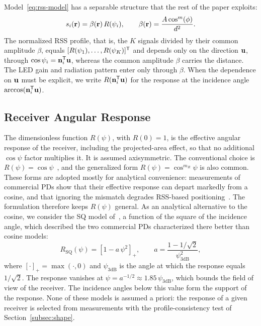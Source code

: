 Model~\eqref{eq:rss-model} has a separable structure that the rest of the paper exploits:
\begin{equation}
 s_i(\mathbf{r})=\beta(\mathbf{r})\,R(\psi_i),\qquad
 \beta(\mathbf{r})=\frac{A\cos^{m}(\phi)}{d^2}.
 \label{eq:separable}
\end{equation}
The normalized RSS profile, that is, the $K$ signals divided by their common amplitude $\beta$, equals $[R(\psi_1),\ldots,R(\psi_K)]^{\mathsf T}$ and depends only on the direction $\mathbf{u}$, through $\cos\psi_i=\mathbf{n}_i^{\mathsf T}\mathbf{u}$, whereas the common amplitude $\beta$ carries the distance. The LED gain and radiation pattern enter only through $\beta$. When the dependence on $\mathbf{u}$ must be explicit, we write $R(\mathbf{n}_i^{\mathsf T}\mathbf{u})$ for the response at the incidence angle $\arccos(\mathbf{n}_i^{\mathsf T}\mathbf{u})$.

\subsection{Receiver Angular Response}
\label{subsec:response}
The dimensionless function $R(\psi)$, with $R(0)=1$, is the effective angular response of the receiver, including the projected-area effect, so that no additional $\cos\psi$ factor multiplies it. It is assumed axisymmetric. The conventional choice is $R(\psi)=\cos\psi$~\cite{Kahn1997,Wang2024}, and the generalized form $R(\psi)=\cos^{m_R}\psi$ is also common. These forms are adopted mostly for analytical convenience: measurements of commercial PDs show that their effective response can depart markedly from a cosine, and that ignoring the mismatch degrades RSS-based positioning~\cite{Bastiaens2020}. The formulation therefore keeps $R(\psi)$ general. As an analytical alternative to the cosine, we consider the SQ model of~\cite{Bastiaens2020}, a function of the square of the incidence angle, which described the two commercial PDs characterized there better than cosine models:
\begin{equation}
 R_{\mathrm{SQ}}(\psi)=
 \left[1-a\,\psi^2\right]_+,\qquad
 a=\frac{1-1/\sqrt2}{\psi_{3\mathrm{dB}}^2},
 \label{eq:sq-response}
\end{equation}
where $[\cdot]_+=\max(\cdot,0)$ and $\psi_{3\mathrm{dB}}$ is the angle at which the response equals $1/\sqrt2$. The response vanishes at $\psi=a^{-1/2}\approx1.85\,\psi_{3\mathrm{dB}}$, which bounds the field of view of the receiver. The incidence angles below this value form the support of the response. None of these models is assumed a priori: the response of a given receiver is selected from measurements with the profile-consistency test of Section~\ref{subsec:shape}.

